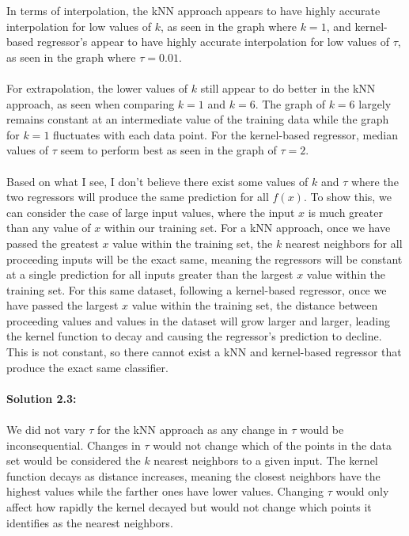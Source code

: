 \documentclass[submit]{harvardml}
\begin{document}
In terms of interpolation, the kNN approach appears to have highly accurate interpolation for low values of $k$, as seen in the graph where $k=1$, and kernel-based regressor's appear to have highly accurate interpolation for low values of $\tau$, as seen in the graph where $\tau = 0.01$. \\ \\
For extrapolation, the lower values of $k$ still appear to do better in the kNN approach, as seen when comparing $k=1$ and $k=6$. The graph of $k=6$ largely remains constant at an intermediate value of the training data while the graph for $k=1$ fluctuates with each data point. For the kernel-based regressor, median values of $\tau$ seem to perform best as seen in the graph of $\tau = 2$. \\ \\
Based on what I see, I don't believe there exist some values of $k$ and $\tau$ where the two regressors will produce the same prediction for all $f(x)$. To show this, we can consider the case of large input values, where the input $x$ is much greater than any value of $x$ within our training set. For a kNN approach, once we have passed the greatest $x$ value within the training set, the $k$ nearest neighbors for all proceeding inputs will be the exact same, meaning the regressors will be constant at a single prediction for all inputs greater than the largest $x$ value within the training set. For this same dataset, following a kernel-based regressor, once we have passed the largest $x$ value within the training set, the distance between proceeding values and values in the dataset will grow larger and larger, leading the kernel function to decay and causing the regressor's prediction to decline. This is not constant, so there cannot exist a kNN and kernel-based regressor that produce the exact same classifier. \\ \\
\textbf{Solution 2.3:}\\ \\
We did not vary $\tau$ for the kNN approach as any change in $\tau$ would be inconsequential. Changes in $\tau$ would not change which of the points in the data set would be considered the $k$ nearest neighbors to a given input. The kernel function decays as distance increases, meaning the closest neighbors have the highest values while the farther ones have lower values. Changing $\tau$ would only affect how rapidly the kernel decayed but would not change which points it identifies as the nearest neighbors.
\end{document}
